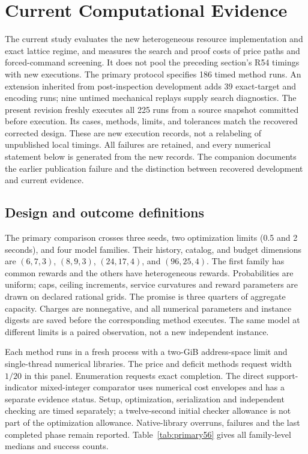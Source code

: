 \section{Current Computational Evidence}\label{sec:study56}
The current study evaluates the new heterogeneous resource implementation and exact lattice regime, and measures the search and proof costs of price paths and forced-command screening. It does not pool the preceding section's R54 timings with new executions. The primary protocol specifies 186 timed method runs. An extension inherited from post-inspection development adds 39 exact-target and encoding runs; nine untimed mechanical replays supply search diagnostics. The present revision freshly executes all 225 runs from a source snapshot committed before execution. Its cases, methods, limits, and tolerances match the recovered corrected design. These are new execution records, not a relabeling of unpublished local timings. All failures are retained, and every numerical statement below is generated from the new records. The companion documents the earlier publication failure and the distinction between recovered development and current evidence.

\subsection{Design and outcome definitions}
The primary comparison crosses three seeds, two optimization limits (0.5 and 2 seconds), and four model families. Their history, catalog, and budget dimensions are $(6,7,3)$, $(8,9,3)$, $(24,17,4)$, and $(96,25,4)$. The first family has common rewards and the others have heterogeneous rewards. Probabilities are uniform; caps, ceiling increments, service curvatures and reward parameters are drawn on declared rational grids. The promise is three quarters of aggregate capacity. Charges are nonnegative, and all numerical parameters and instance digests are saved before the corresponding method executes. The same model at different limits is a paired observation, not a new independent instance.

Each method runs in a fresh process with a two-GiB address-space limit and single-thread numerical libraries. The price and deficit methods request width $1/20$ in this panel. Enumeration requests exact completion. The direct support-indicator mixed-integer comparator uses numerical cost envelopes and has a separate evidence status. Setup, optimization, serialization and independent checking are timed separately; a twelve-second initial checker allowance is not part of the optimization allowance. Native-library overruns, failures and the last completed phase remain reported. Table~\ref{tab:primary56} gives all family-level medians and success counts.


